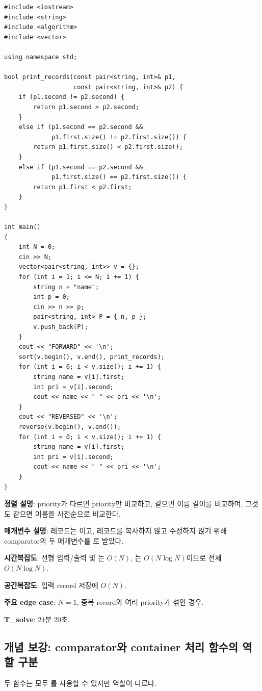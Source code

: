 \begin{answerbox}[학습자 제출 답안]
\begin{lstlisting}
#include <iostream>
#include <string>
#include <algorithm>
#include <vector>

using namespace std;

bool print_records(const pair<string, int>& p1,
                   const pair<string, int>& p2) {
    if (p1.second != p2.second) {
        return p1.second > p2.second;
    }
    else if (p1.second == p2.second &&
             p1.first.size() != p2.first.size()) {
        return p1.first.size() < p2.first.size();
    }
    else if (p1.second == p2.second &&
             p1.first.size() == p2.first.size()) {
        return p1.first < p2.first;
    }
}

int main()
{
    int N = 0;
    cin >> N;
    vector<pair<string, int>> v = {};
    for (int i = 1; i <= N; i += 1) {
        string n = "name";
        int p = 0;
        cin >> n >> p;
        pair<string, int> P = { n, p };
        v.push_back(P);
    }
    cout << "FORWARD" << '\n';
    sort(v.begin(), v.end(), print_records);
    for (int i = 0; i < v.size(); i += 1) {
        string name = v[i].first;
        int pri = v[i].second;
        cout << name << " " << pri << '\n';
    }
    cout << "REVERSED" << '\n';
    reverse(v.begin(), v.end());
    for (int i = 0; i < v.size(); i += 1) {
        string name = v[i].first;
        int pri = v[i].second;
        cout << name << " " << pri << '\n';
    }
}
\end{lstlisting}

\textbf{정렬 설명}: priority가 다르면 priority만 비교하고, 같으면 이름 길이를 비교하며, 그것도 같으면 이름을 사전순으로 비교한다.

\textbf{매개변수 설명}: 레코드는 이고, 레코드를 복사하지 않고 수정하지 않기 위해 comparator의 두 매개변수를 로 받았다.

\textbf{시간복잡도}: 선형 입력/출력 및 는 $O(N)$, 는 $O(N\log N)$이므로 전체 $O(N\log N)$.

\textbf{공간복잡도}: 입력 record 저장에 $O(N)$.

\textbf{주요 edge case}: $N=1$, 중복 record와 여러 priority가 섞인 경우.

\textbf{T\_solve}: 24분 20초.
\end{answerbox}

\subsection{개념 보강: comparator와 container 처리 함수의 역할 구분}
두 함수는 모두 를 사용할 수 있지만 역할이 다르다.

